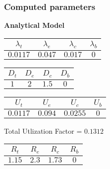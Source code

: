 \documentclass{article}
\begin{document}
\subsubsection{Computed parameters}
\begin{minipage}{0.5\textwidth}
\centering	\textbf{Analytical Model}
\begin{table}[H]
\centering
\begin{tabular}{@{}cccc@{}}
\toprule
$\lambda_t$ & $\lambda_e$ & $\lambda_c$ & $\lambda_b$\\
\midrule
$0.0117$ & $0.047$ & $0.017$ & $0$\\
\bottomrule
\end{tabular}
\end{table}\begin{table}[H]
\centering
\begin{tabular}{@{}cccc@{}}
\toprule
$D_t$ & $D_e$ & $D_c$ & $D_b$\\
\midrule
$1$ & $2$ & $1.5$ & $0$\\
\bottomrule
\end{tabular}
\end{table}\begin{table}[H]
\centering
\begin{tabular}{@{}cccc@{}}
\toprule
$U_t$ & $U_e$ & $U_c$ & $U_b$\\
\midrule
$0.0117$ & $0.094$ & $0.0255$ & $0$\\
\bottomrule
\end{tabular}
\end{table}
\centering Total Utlization Factor = $0.1312$
\begin{table}[H]
\centering
\begin{tabular}{@{}cccc@{}}
\toprule
$R_t$ & $R_e$ & $R_c$ & $R_b$\\
\midrule
$1.15$ & $2.3$ & $1.73$ & $0$\\
\bottomrule
\end{tabular}
\end{table}
\end{minipage}
\end{document}

